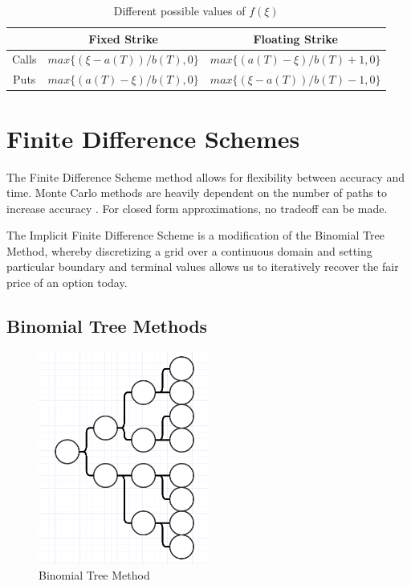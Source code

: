 \documentclass{article}
\begin{document}
\begin{table}[H]
  \begin{tabular}{|c|c|c|}
    \hline
    & Fixed Strike & Floating Strike \\
    \hline
    Calls & \(max\{(\xi - a(T))/b(T), 0\}\) & \(max\{(a(T) - \xi)/b(T) + 1, 0\}\) \\
    Puts & \(max\{(a(T) - \xi)/b(T ), 0\}\) & \(max\{(\xi - a(T))/b(T) - 1, 0\}\)\\
    \hline
  \end{tabular}
  \caption{Different possible values of \(f(\xi)\)}
\end{table}

\section{Finite Difference Schemes}

The Finite Difference Scheme method allows for flexibility between accuracy and time. Monte Carlo methods are heavily dependent on the number of paths to increase accuracy \cite{montecarlo}. For closed form approximations, no tradeoff can be made.

The Implicit Finite Difference Scheme is a modification of the Binomial Tree Method, whereby discretizing a grid over a continuous domain and setting particular boundary and terminal values allows us to iteratively recover the fair price of an option today.

\subsection{Binomial Tree Methods}
\begin{figure}[H]
  \includegraphics[width=0.5\textwidth]{btm}
  \caption{Binomial Tree Method}
  \label{figure:name}
\end{figure}
\end{document}
